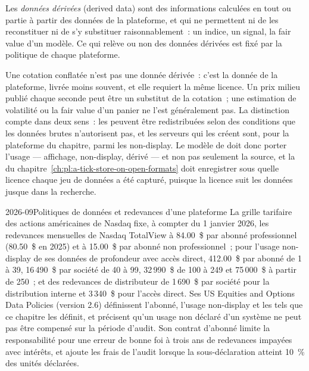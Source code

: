 \begin{definition}\label{def:pl:market-data-distribution-and-entitlements:derived}
Les \emph{données dérivées} (derived data) sont des informations calculées en tout ou partie à partir des données de la plateforme, et qui ne permettent
ni de les reconstituer ni de s'y substituer raisonnablement~: un indice, un signal, la fair value d'un modèle. Ce qui relève ou non des données dérivées est fixé par
la politique de chaque plateforme.
\end{definition}

Une cotation conflatée n'est pas une donnée dérivée~: c'est la donnée de la plateforme, livrée moins souvent, et elle requiert la même licence. Un prix milieu publié chaque
seconde peut être un substitut de la cotation~; une estimation de volatilité ou la fair value d'un panier ne l'est généralement pas. La distinction compte dans deux
sens~: les  peuvent être redistribuées selon des conditions que les données brutes n'autorisent pas, et les serveurs qui les créent sont, pour la
plateforme du chapitre, parmi les  non-display. Le modèle de  doit donc porter l'usage --- affichage, non-display,
dérivé --- et non pas seulement la source, et la  du chapitre~\ref{ch:pl:a-tick-store-on-open-formats} doit enregistrer sous quelle licence
chaque jeu de données a été capturé, puisque la licence suit les données jusque dans la recherche.

\begin{dated}{2026-09}{Politiques de données et redevances d'une plateforme}\label{dat:pl:market-data-distribution-and-entitlements:nasdaq}
La grille tarifaire des actions américaines de Nasdaq fixe, à compter du 1 janvier 2026, les redevances mensuelles de Nasdaq TotalView à 84.00~\$ par abonné professionnel (80.50~\$ en 2025) et à 15.00~\$ par abonné non professionnel~;
pour l'usage non-display de ses données de profondeur avec accès direct, 412.00~\$ par abonné de 1 à 39,
16\,490~\$ par société de 40 à 99, 32\,990~\$ de 100 à 249 et 75\,000~\$ à partir de 250~; et des redevances de distributeur de 1\,690~\$ par société pour la distribution
interne et 3\,340~\$ pour l'accès direct. Ses US Equities and Options Data Policies (version 2.6) définissent l'abonné, l'usage non-display et les
 tels que ce chapitre les définit, et précisent qu'un usage non déclaré d'un système ne peut pas être compensé sur la période d'audit.
Son contrat d'abonné limite la responsabilité pour une erreur de bonne foi à trois ans de redevances impayées avec intérêts, et ajoute les frais de l'audit lorsque la sous-déclaration
atteint 10~\% des unités déclarées.
\end{dated}

